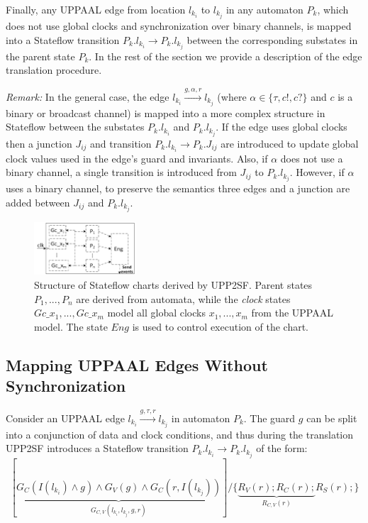 Finally, any UPPAAL edge from location $l_{k_i}$ to $l_{k_j}$ in any automaton $P_k$, which does not use global clocks and synchronization over binary channels, is mapped into a Stateflow transition $P_k.l_{k_i}\rightarrow P_k.l_{k_j}$ between the corresponding substates in the parent state $P_k$. In the rest of the section we provide a description of the edge translation procedure. 


\emph{Remark:} In the general case, the edge $l_{k_i}\xrightarrow{g,\alpha,r} l_{k_j}$ (where $\alpha\in\{\tau,c!,c?\}$ and $c$ is a binary or broadcast channel) is mapped into a more complex structure in Stateflow between the substates $P_k.l_{k_i}$ and $P_k.l_{k_j}$. If the edge uses global clocks then a junction $J_{ij}$ and transition $P_k.l_{k_i}\rightarrow P_k.J_{ij}$ are introduced to update global clock values used in the edge's guard and invariants. Also, if $\alpha$ does not use a binary channel, a single transition is introduced from $J_{ij}$ to $P_k.l_{k_j}$. However, if $\alpha$ uses a binary channel, to preserve the semantics three edges and a junction are added between $J_{ij}$ and $P_k.l_{k_j}$.




\begin{figure} [!t]
\center
\includegraphics[width=0.34\textwidth]{figs/chart_GlobalClocks_rev1.png} 
\caption{Structure of Stateflow charts derived by UPP2SF. Parent states $P_1,...,P_n$ are derived from automata, while the \textit{clock} states $Gc\_{x_1},..., Gc\_{x_m}$ model all global clocks $x_1,...,x_m$ from the UPPAAL model. The state $Eng$ is used to control execution of the chart.}
\label{fig:chart}
\end{figure}

\subsection{Mapping UPPAAL Edges Without Synchronization}
\label{sec:upp_noSync}


Consider an UPPAAL edge $l_{k_i}\xrightarrow{g,\tau,r} l_{k_j}$ in automaton $P_k$. The guard $g$ can be split into a conjunction of data and clock conditions, and thus during the translation UPP2SF introduces a Stateflow transition $P_k.l_{k_i}\rightarrow P_k.l_{k_j}$ of the form:
\begin{equation}
\label{eqn:trans}
[\underbrace{G_C(I(l_{k_i})\wedge g) \wedge G_V(g) \wedge G_C(r,I(l_{k_j}))}_{G_{C,V}(l_{k_i},l_{k_j},g,r)}] /\{\underbrace{R_V(r); R_C(r);}_{R_{C,V}(r)} R_S(r);\}
\end{equation}

